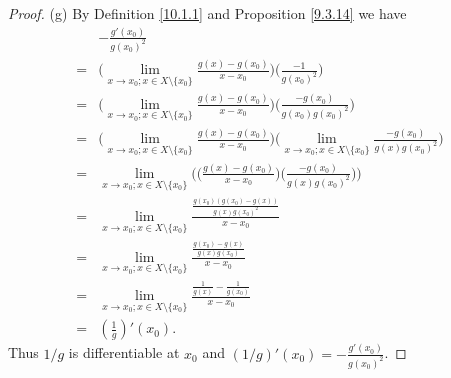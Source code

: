 \begin{proof}{(g)}
    By Definition \ref{10.1.1} and Proposition \ref{9.3.14} we have
    \begin{align*}
          & -\frac{g'(x_0)}{g(x_0)^2}                                                                                                                                                     \\
        = & \bigg(\lim_{x \to x_0 ; x \in X \setminus \{x_0\}} \frac{g(x) - g(x_0)}{x - x_0}\bigg) \bigg(\frac{-1}{g(x_0)^2}\bigg)                                                        \\
        = & \bigg(\lim_{x \to x_0 ; x \in X \setminus \{x_0\}} \frac{g(x) - g(x_0)}{x - x_0}\bigg) \bigg(\frac{-g(x_0)}{g(x_0) g(x_0)^2}\bigg)                                            \\
        = & \bigg(\lim_{x \to x_0 ; x \in X \setminus \{x_0\}} \frac{g(x) - g(x_0)}{x - x_0}\bigg) \bigg(\lim_{x \to x_0 ; x \in X \setminus \{x_0\}} \frac{-g(x_0)}{g(x) g(x_0)^2}\bigg) \\
        = & \lim_{x \to x_0 ; x \in X \setminus \{x_0\}} \Bigg(\bigg(\frac{g(x) - g(x_0)}{x - x_0}\bigg) \bigg(\frac{-g(x_0)}{g(x) g(x_0)^2}\bigg)\Bigg)                                  \\
        = & \lim_{x \to x_0 ; x \in X \setminus \{x_0\}} \frac{\frac{g(x_0)(g(x_0) - g(x))}{g(x) g(x_0)^2}}{x - x_0}                                                                      \\
        = & \lim_{x \to x_0 ; x \in X \setminus \{x_0\}} \frac{\frac{g(x_0) - g(x)}{g(x) g(x_0)}}{x - x_0}                                                                                \\
        = & \lim_{x \to x_0 ; x \in X \setminus \{x_0\}} \frac{\frac{1}{g(x)} - \frac{1}{g(x_0)}}{x - x_0}                                                                                \\
        = & (\frac{1}{g})'(x_0).
    \end{align*}
    Thus \(1 / g\) is differentiable at \(x_0\) and \((1 / g)'(x_0) = -\frac{g'(x_0)}{g(x_0)^2}\).
\end{proof}

